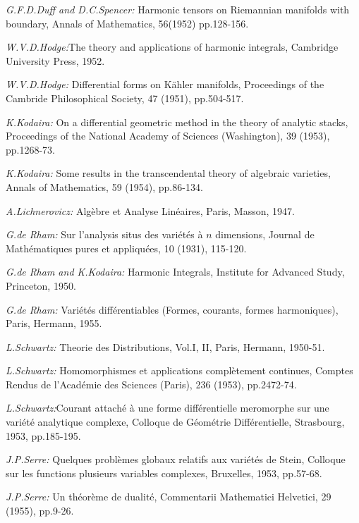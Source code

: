 \begin{thebibliography}{99}
 {\em G.\@ F.\@ D.\@ Duff and D.\@ C.\@ Spencer:} Harmonic
  tensors on Riemannian manifolds with boundary, Annals of
  Mathematics, 56(1952) pp.\@ 128-156.

 {\em W.\@ V.\@ D.\@ Hodge:}\pageoriginale The theory and
  applications 
  of harmonic integrals, Cambridge University Press, 1952.

 {\em W.\@ V.\@ D.\@ Hodge:} Differential forms on
  K\"ahler manifolds, Proceedings of the Cambride Philosophical
  Society, 47 (1951), pp.\@ 504-517.

 {\em K.\@ Kodaira:} On a differential geometric method in
  the theory of analytic stacks, Proceedings of the National Academy
  of Sciences (Washington), 39 (1953), pp.\@ 1268-73.

 {\em K.\@ Kodaira:} Some results in the transcendental
  theory of algebraic varieties, Annals of Mathematics, 59 (1954),
  pp.\@ 86-134.

 {\em A.\@ Lichnerovicz:} Alg\`ebre et Analyse
  Lin\'eaires, Paris, Masson, 1947.

 {\em G.\@ de Rham:} Sur l'analysis situs des vari\'et\'es
  \`a $n$ dimensions, Journal de Math\'ematiques pures et appliqu\'ees,
  10 (1931), 115-120.

 {\em G.\@ de Rham and K.\@ Kodaira:} Harmonic Integrals,
  Institute for Advanced Study, Princeton, 1950.

 {\em G.\@ de Rham:} Vari\'et\'es diff\'erentiables
  (Formes, courants, formes harmoniques), Paris, Hermann, 1955.

 {\em L.\@ Schwartz:} Theorie des Distributions, Vol.\@ I,
  II, Paris, Hermann, 1950-51.

 {\em L.\@ Schwartz:} Homomorphismes et applications
  compl\`etement continues, Comptes Rendus de l'Acad\'emie des
  Sciences (Paris), 236 (1953), pp.\@ 2472-74.

 {\em L.\@ Schwartz:}\pageoriginale Courant attach\'e \`a
  une forme diff\'erentielle meromorphe sur une vari\'et\'e analytique
  complexe, Colloque de G\'eom\'etrie Diff\'erentielle, Strasbourg,
  1953, pp.\@ 185-195.

 {\em J.\@ P.\@ Serre:} Quelques probl\`emes globaux
  relatifs aux vari\'et\'es de Stein, Colloque sur les functions
  plusieurs variables complexes, Bruxelles, 1953, pp.\@ 57-68.

 {\em J.\@ P.\@ Serre:} Un th\'eor\`eme de dualit\'e,
  Commentarii Mathematici Helvetici, 29 (1955), pp.\@ 9-26.


\end{thebibliography}
